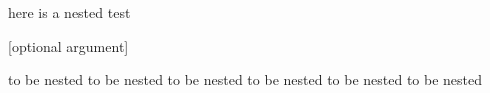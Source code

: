 here is a nested test
\begin{one}


	[optional argument]



	to be nested to be nested
	to be nested to be nested
	to be nested to be nested
\end{one}
